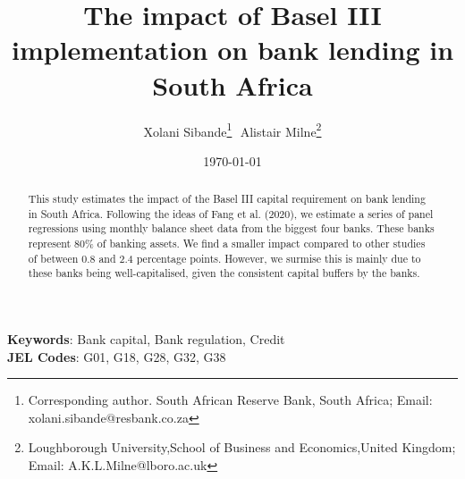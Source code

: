 
\title{The impact of Basel III implementation on bank lending in South Africa}


\author{ 
Xolani Sibande\footnote{Corresponding author. South African Reserve Bank, South Africa; Email: xolani.sibande@resbank.co.za}\,\,
Alistair Milne\footnote{Loughborough University,School of Business and Economics,United Kingdom; Email: A.K.L.Milne@lboro.ac.uk} 
}
\date{\today}
\maketitle

\begin{abstract}
This study estimates the impact of the Basel III capital requirement on bank lending in South Africa. Following the ideas of Fang et al. (2020), we estimate a series of panel regressions using monthly balance sheet data from the biggest four banks. These banks represent 80\% of banking assets. We find a smaller impact compared to other studies of between 0.8 and 2.4 percentage points. However, we surmise this is mainly due to these banks being well-capitalised, given the consistent capital buffers by the banks. 

\end{abstract}

\noindent\textbf{Keywords}: Bank capital, Bank regulation, Credit   \\
\textbf{JEL Codes}: G01, G18, G28, G32, G38
\newpage